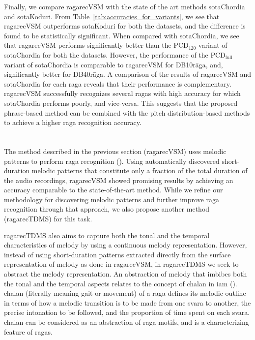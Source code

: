 Finally, we compare \acrshort{ragarecVSM} with the state of the art methods \acrshort{sotaChordia} and \acrshort{sotaKoduri}. From Table~\ref{tab:accuracies_for_variants}, we see that \acrshort{ragarecVSM} outperforms \acrshort{sotaKoduri} for both the datasets, and the difference is found to be statistically significant. When compared with \acrshort{sotaChordia}, we see that \acrshort{ragarecVSM} performs significantly better than the $\mathrm{PCD}_{120}$ variant of \acrshort{sotaChordia} for both the datasets. However, the performance of the $\mathrm{PCD}_\mathrm{full}$ variant of \acrshort{sotaChordia} is comparable to \acrshort{ragarecVSM} for DB10r\={a}ga, and, significantly better for DB40r\={a}ga. A comparison of the results of \acrshort{ragarecVSM} and \acrshort{sotaChordia} for each \gls{raga} reveals that their performance is complementary. \acrshort{ragarecVSM} successfully recognizes several \glspl{raga} with high accuracy for which \acrshort{sotaChordia} performs poorly, and vice-versa. This suggests that the proposed phrase-based method can be combined with the pitch distribution-based methods to achieve a higher \gls{raga} recognition accuracy.






\section{}
\label{sec:tdms_raga_recognition}

The method described in the previous section (\acrshort{ragarecVSM}) uses melodic patterns to perform \gls{raga} recognition (). Using automatically discovered short-duration melodic patterns that constitute only a fraction of the total duration of the audio recordings, \acrshort{ragarecVSM} showed promising results by achieving an accuracy comparable to the state-of-the-art method. While we refine our methodology for discovering melodic patterns and further improve \gls{raga} recognition through that approach, we also propose another method (\acrshort{ragarecTDMS}) for this task. 

\acrshort{ragarecTDMS} also aims to capture both the tonal and the temporal characteristics of melody by using a continuous melody representation. However, instead of using short-duration patterns extracted directly from the surface representation of melody as done in \acrshort{ragarecVSM}, in \acrshort{ragarecTDMS} we seek to abstract the melody representation. An abstraction of melody that imbibes both the tonal and the temporal aspects relates to the concept of \gls{chalan} in \gls{iam} (). \Gls{chalan} (literally meaning gait or movement) of a \gls{raga} defines its melodic outline in terms of how a melodic transition is to be made from one \gls{svara} to another, the precise intonation to be followed, and the proportion of time spent on each \gls{svara}. \Gls{chalan} can be considered as an abstraction of \gls{raga} motifs, and is a characterizing feature of \glspl{raga}.


